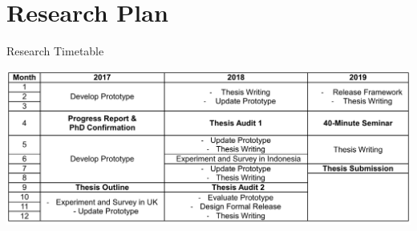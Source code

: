 \documentclass[12pt, a4paper]{report} \usepackage[titletoc]{appendix}
\begin{document}
\chapter{Research Plan}
\label{Research Plan}

\begin {table}[th]
\caption {Research Timetable} 
\includegraphics[width=\textwidth]{timetable}
\label{Research Timetable}
\end{table}
\end{document}
